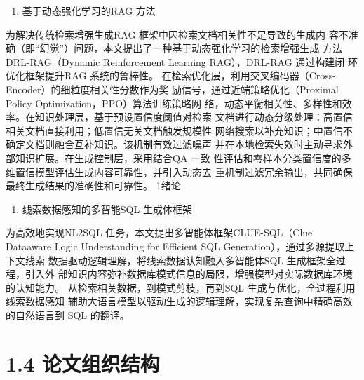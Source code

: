 \documentclass[12pt,a4paper,openright,UTF8]{ctexbook}
\begin{document}
\begin{enumerate}[label=(\arabic*)]
\item 基于动态强化学习的RAG 方法
\end{enumerate}
为解决传统检索增强生成RAG 框架中因检索文档相关性不足导致的生成内 容不准确（即“幻觉”）问题，本文提出了一种基于动态强化学习的检索增强生成 方法DRL-RAG（Dynamic Reinforcement Learning RAG），DRL-RAG 通过构建闭 环优化框架提升RAG 系统的鲁棒性。 在检索优化层，利用交叉编码器（Cross-Encoder）的细粒度相关性分数作为奖 励信号，通过近端策略优化（Proximal Policy Optimization，PPO）算法训练策略网 络，动态平衡相关性、多样性和效率。在知识处理层，基于预设置信度阈值对检索 文档进行动态分级处理：高置信相关文档直接利用；低置信无关文档触发规模性 网络搜索以补充知识；中置信不确定文档则融合互补知识。该机制有效过滤噪声 并在本地检索失效时主动寻求外部知识扩展。在生成控制层，采用结合QA 一致 性评估和零样本分类置信度的多维置信模型评估生成内容可靠性，并引入动态去 重机制过滤冗余输出，共同确保最终生成结果的准确性和可靠性。 1绪论

\begin{enumerate}[label=(\arabic*)]
\item 线索数据感知的多智能SQL 生成体框架
\end{enumerate}
为高效地实现NL2SQL 任务，本文提出多智能体框架CLUE-SQL（Clue Dataaware Logic Understanding for Efficient SQL Generation），通过多源提取上下文线索 数据驱动逻辑理解，将线索数据认知融入多智能体SQL 生成框架全过程，引入外 部知识内容弥补数据库模式信息的局限，增强模型对实际数据库环境的认知能力。 从检索相关数据，到模式剪枝，再到SQL 生成与优化，全过程利用线索数据感知 辅助大语言模型以驱动生成的逻辑理解，实现复杂查询中精确高效的自然语言到 SQL 的翻译。

\section{1.4 论文组织结构}
\end{document}
